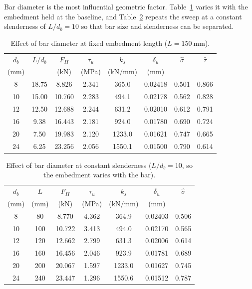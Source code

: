 Bar diameter is the most influential geometric factor.
Table~\ref{tab:sweepdb} varies it with the embedment held at the baseline,
and Table~\ref{tab:sweepdb2} repeats the sweep at a constant slenderness of
$L/d_b = 10$ so that bar size and slenderness can be separated.

\begin{table}[H]
\centering
\caption{Effect of bar diameter at fixed embedment length
         ($L = \SI{150}{\milli\metre}$).}
\label{tab:sweepdb}
\small
\begin{tabular*}{\linewidth}{@{\extracolsep{\fill}}cccccccc@{}}
\hline
$d_b$ & $L/d_b$ & $F_{II}$ & $\tau_u$ & $k_s$ & $\delta_u$
      & $\hat\sigma$ & $\hat\tau$ \\
(mm)  &        & (kN)      & (MPa)    & (kN/mm) & (mm) & & \\
\hline
8  & 18.75 & 8.826  & 2.341 & 365.0  & 0.02418 & 0.501 & 0.866 \\
10 & 15.00 & 10.760 & 2.283 & 494.1  & 0.02178 & 0.562 & 0.828 \\
12 & 12.50 & 12.688 & 2.244 & 631.2  & 0.02010 & 0.612 & 0.791 \\
16 & 9.38  & 16.443 & 2.181 & 924.0  & 0.01780 & 0.690 & 0.724 \\
20 & 7.50  & 19.983 & 2.120 & 1233.0 & 0.01621 & 0.747 & 0.665 \\
24 & 6.25  & 23.256 & 2.056 & 1550.1 & 0.01500 & 0.790 & 0.614 \\
\hline
\end{tabular*}
\end{table}

\begin{table}[H]
\centering
\caption{Effect of bar diameter at constant slenderness
         ($L/d_b = 10$, so the embedment varies with the bar).}
\label{tab:sweepdb2}
\small
\begin{tabular*}{\linewidth}{@{\extracolsep{\fill}}ccccccc@{}}
\hline
$d_b$ & $L$ & $F_{II}$ & $\tau_u$ & $k_s$ & $\delta_u$ & $\hat\sigma$ \\
(mm)  & (mm) & (kN)     & (MPa)    & (kN/mm) & (mm) & \\
\hline
8  & 80  & 8.770  & 4.362 & 364.9  & 0.02403 & 0.506 \\
10 & 100 & 10.722 & 3.413 & 494.0  & 0.02170 & 0.565 \\
12 & 120 & 12.662 & 2.799 & 631.3  & 0.02006 & 0.614 \\
16 & 160 & 16.456 & 2.046 & 923.9  & 0.01781 & 0.689 \\
20 & 200 & 20.067 & 1.597 & 1233.0 & 0.01627 & 0.745 \\
24 & 240 & 23.447 & 1.296 & 1550.6 & 0.01512 & 0.787 \\
\hline
\end{tabular*}
\end{table}

